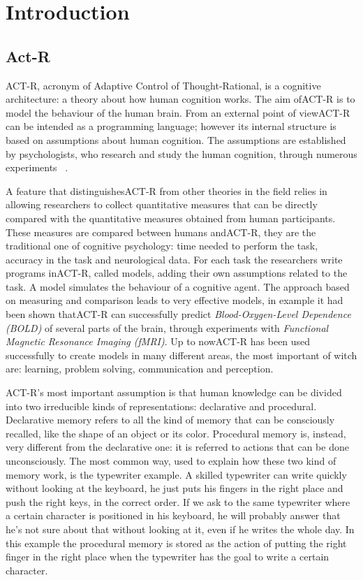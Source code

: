 \chapter{Introduction}
\section{Act-R}


ACT-R, acronym of Adaptive Control of Thought-Rational, is a cognitive architecture: a theory about how human cognition works. 
The aim of\mbox{ACT-R} is to model the behaviour of the human brain. From an external point of view\mbox{ACT-R} can be intended as a programming language; however its internal structure is based on assumptions about human cognition. The assumptions are established by psychologists, who research and study the human cognition, through numerous experiments ~\cite{Allen94}. 

A feature that distinguishes\mbox{ACT-R} from other theories in the field relies in allowing researchers to collect quantitative measures that can be directly compared with the quantitative measures obtained from human participants. These measures are compared between humans and\mbox{ACT-R}, they are the traditional one of cognitive psychology: time needed to perform the task, accuracy in the task and neurological data. For each task the researchers write programs in\mbox{ACT-R}, called models, adding their own assumptions related to the task. A model simulates the behaviour of a cognitive agent. The approach based on measuring and comparison leads to very effective models, in example it had been shown that\mbox{ACT-R} can successfully predict \emph{Blood-Oxygen-Level Dependence (BOLD)} of several parts of the brain, through experiments with \emph{Functional Magnetic Resonance Imaging (fMRI)}.
Up to now\mbox{ACT-R} has been used successfully to create models in many different areas, the most important of witch are: learning, problem solving, communication and perception.

ACT-R's most important assumption is that human knowledge can be divided into two irreducible kinds of representations: declarative and procedural.
Declarative memory refers to all the kind of memory that can be consciously recalled, like the shape of an object or its color. Procedural memory is, instead, very different from the declarative one: it is referred to actions that can be done unconsciously. The most common way, used to explain how these two kind of memory work, is the typewriter example.
A skilled typewriter can write quickly without looking at the keyboard, he just puts his fingers in the right place and push the right keys, in the correct order. If we ask to the same typewriter where a certain character is positioned in his keyboard, he will probably answer that he's not sure about that without looking at it, even if he writes the whole day. In this example the procedural memory is stored as the action of putting the right finger in the right place when the typewriter has the goal to write a certain character.

